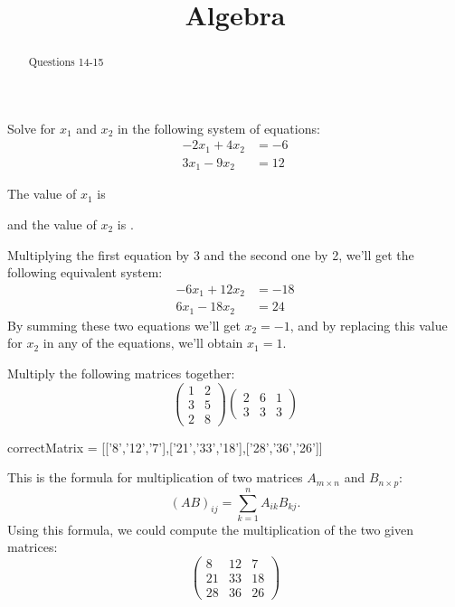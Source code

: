 \documentclass{ximera}
\title{Algebra}
\begin{document}
\begin{abstract}
  Questions 14-15
\end{abstract}
\maketitle

\begin{question}
Solve for $x_1$ and $x_2$ in the following system of equations:
\begin{align*}
-2x_1 + 4x_2 &= -6\\
3x_1  - 9x_2 &=  12 
\end{align*}
\begin{solution}
The value of $x_1$ is 
\end{solution}
\begin{solution}
and the value of $x_2$ is .
\end{solution}
Multiplying the first equation by 3 and the second one by 2, we'll get the following equivalent system:
\begin{align*}
 -6  x_1  + 12  x_2 &= -18 \\
 6  x_1  - 18  x_2 &= 24
\end{align*}
By summing these two equations we'll get $x_2 = -1$, and by replacing
this value for $x_2$ in any of the equations, we'll obtain $x_1 = 1$.
\end{question}

\begin{question}
Multiply the following matrices together:
\[ 
\left( \begin{array}{cc}
1 & 2 \\
3 & 5 \\
2 & 8
\end{array} \right)
\left( \begin{array}{ccc}
2 & 6 & 1 \\
3 & 3 & 3
\end{array} \right)
\]
\begin{solution}
\begin{matrix-answer}[name=M]
    correctMatrix = [['8','12','7'],['21','33','18'],['28','36','26']]
\end{matrix-answer}
\end{solution}
This is the formula for multiplication of two matrices $A_{m \times n}$ and $B_{n \times p}$:
\[
    (AB)_{ij} = \sum_{k=1}^n A_{ik}B_{kj}. 
\]
Using this formula, we could compute the multiplication of the two given matrices:
\[
\begin{pmatrix}
8 & 12 & 7 \\
21 & 33 & 18 \\
28 & 36 & 26
\end{pmatrix}
\]
\end{question}
\end{document}
